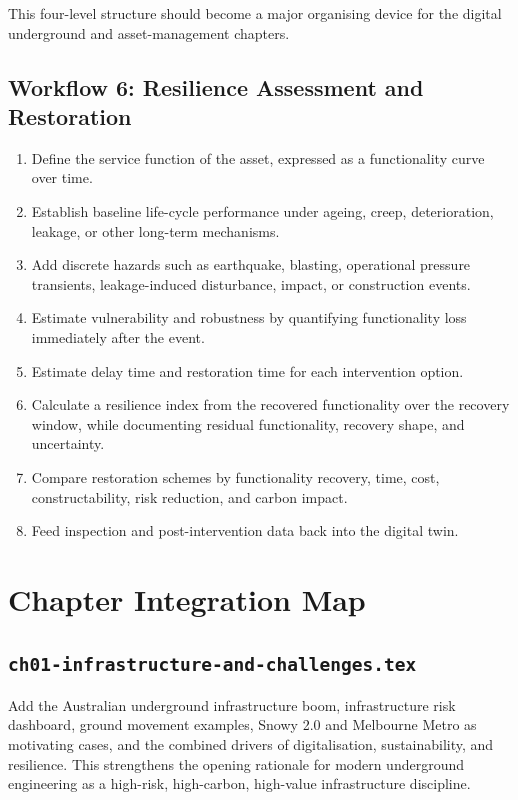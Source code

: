 \documentclass[11pt]{article}
\begin{document}
This four-level structure should become a major organising device for the
digital underground and asset-management chapters.

\subsection{Workflow 6: Resilience Assessment and Restoration}

\begin{enumerate}
  \item Define the service function of the asset, expressed as a functionality
  curve over time.
  \item Establish baseline life-cycle performance under ageing, creep,
  deterioration, leakage, or other long-term mechanisms.
  \item Add discrete hazards such as earthquake, blasting, operational pressure
  transients, leakage-induced disturbance, impact, or construction events.
  \item Estimate vulnerability and robustness by quantifying functionality loss
  immediately after the event.
  \item Estimate delay time and restoration time for each intervention option.
  \item Calculate a resilience index from the recovered functionality over the
  recovery window, while documenting residual functionality, recovery shape, and
  uncertainty.
  \item Compare restoration schemes by functionality recovery, time, cost,
  constructability, risk reduction, and carbon impact.
  \item Feed inspection and post-intervention data back into the digital twin.
\end{enumerate}

\section{Chapter Integration Map}

\subsection*{\texttt{ch01-infrastructure-and-challenges.tex}}

Add the Australian underground infrastructure boom, infrastructure risk
dashboard, ground movement examples, Snowy 2.0 and Melbourne Metro as
motivating cases, and the combined drivers of digitalisation, sustainability,
and resilience. This strengthens the opening rationale for modern underground
engineering as a high-risk, high-carbon, high-value infrastructure discipline.
\end{document}
